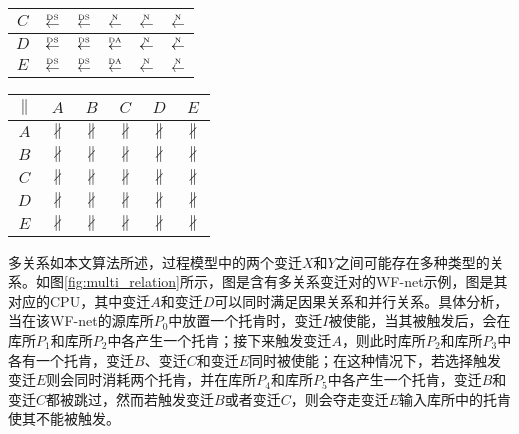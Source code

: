 \begin{table}[htbp]
\begin{subtable}{1\textwidth}
\begin{minipage}[b]{0.3\textwidth}
\begin{tabular}{|c|c|c|c|c|c|}
        $C$ & $\overset{\text{\tiny{DS}}}{\leftarrow}$ & $\overset{\text{\tiny{DS}}}{\leftarrow}$ & $\overset{\text{\tiny{N}}}{\leftarrow}$ & $\overset{\text{\tiny{N}}}{\leftarrow}$ & $\overset{\text{\tiny{N}}}{\leftarrow}$\\ \hline
        $D$ & $\overset{\text{\tiny{DS}}}{\leftarrow}$ & $\overset{\text{\tiny{DS}}}{\leftarrow}$ & $\overset{\text{\tiny{DA}}}{\leftarrow}$ & $\overset{\text{\tiny{N}}}{\leftarrow}$ & $\overset{\text{\tiny{N}}}{\leftarrow}$\\ \hline
        $E$ & $\overset{\text{\tiny{DS}}}{\leftarrow}$ & $\overset{\text{\tiny{DS}}}{\leftarrow}$ & $\overset{\text{\tiny{DA}}}{\leftarrow}$ & $\overset{\text{\tiny{N}}}{\leftarrow}$ & $\overset{\text{\tiny{N}}}{\leftarrow}$\\ \hline
      \end{tabular}
    \end{minipage}
    \begin{minipage}[b]{0.3\textwidth}
      \centering
      \begin{tabular}{|c|c|c|c|c|c|} \hline
        $\parallel$ & $A$ & $B$ & $C$ & $D$ & $E$\\ \hline
        $A$ & $\nparallel$ & $\nparallel$ & $\nparallel$ & $\nparallel$ & $\nparallel$\\ \hline
        $B$ & $\nparallel$ & $\nparallel$ & $\nparallel$ & $\nparallel$ & $\nparallel$\\ \hline
        $C$ & $\nparallel$ & $\nparallel$ & $\nparallel$ & $\nparallel$ & $\nparallel$\\ \hline
        $D$ & $\nparallel$ & $\nparallel$ & $\nparallel$ & $\nparallel$ & $\nparallel$\\ \hline
        $E$ & $\nparallel$ & $\nparallel$ & $\nparallel$ & $\nparallel$ & $\nparallel$\\ \hline
      \end{tabular}
    \end{minipage}
  \end{subtable}
\end{table}

{\heiti 多关系\qquad}如本文算法所述，过程模型中的两个变迁$X$和$Y$之间可能存在多种类型的关系。如图\ref{fig:multi_relation}所示，图是含有多关系变迁对的WF-net示例，图是其对应的CPU，其中变迁$A$和变迁$D$可以同时满足因果关系和并行关系。具体分析，当在该WF-net的源库所$P_{0}$中放置一个托肯时，变迁$I$被使能，当其被触发后，会在库所$P_{1}$和库所$P_{2}$中各产生一个托肯；接下来触发变迁$A$，则此时库所$P_{2}$和库所$P_{3}$中各有一个托肯，变迁$B$、变迁$C$和变迁$E$同时被使能；在这种情况下，若选择触发变迁$E$则会同时消耗两个托肯，并在库所$P_{4}$和库所$P_{5}$中各产生一个托肯，变迁$B$和变迁$C$都被跳过，然而若触发变迁$B$或者变迁$C$，则会夺走变迁$E$输入库所中的托肯使其不能被触发。

